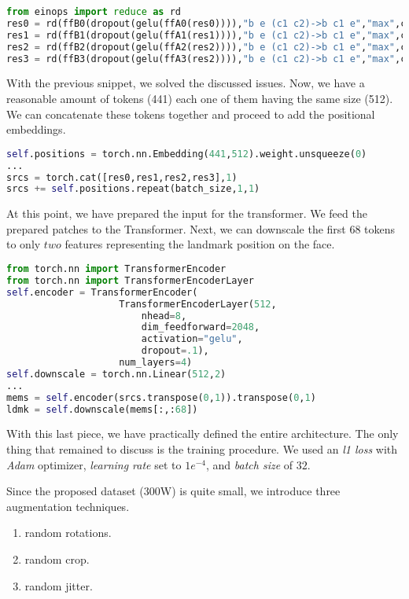 \begin{lstlisting}[language=Python]
from einops import reduce as rd
res0 = rd(ffB0(dropout(gelu(ffA0(res0)))),"b e (c1 c2)->b c1 e","max",c2=16)
res1 = rd(ffB1(dropout(gelu(ffA1(res1)))),"b e (c1 c2)->b c1 e","max",c2=8)
res2 = rd(ffB2(dropout(gelu(ffA2(res2)))),"b e (c1 c2)->b c1 e","max",c2=4)
res3 = rd(ffB3(dropout(gelu(ffA3(res2)))),"b e (c1 c2)->b c1 e","max",c2=1)
\end{lstlisting}

With the previous snippet, we solved the discussed issues. Now, we have a reasonable amount of tokens (441) each one of them having the same size (512). We can concatenate these tokens together and proceed to add the positional embeddings.

\begin{lstlisting}[language=Python]
self.positions = torch.nn.Embedding(441,512).weight.unsqueeze(0)
...
srcs = torch.cat([res0,res1,res2,res3],1) 
srcs += self.positions.repeat(batch_size,1,1)
\end{lstlisting}

At this point, we have prepared the input for the transformer. We feed the prepared patches to the Transformer. Next, we can downscale the first $68$ tokens to only $two$ features representing the landmark position on the face.

\begin{lstlisting}[language=Python]
from torch.nn import TransformerEncoder
from torch.nn import TransformerEncoderLayer
self.encoder = TransformerEncoder(
                    TransformerEncoderLayer(512,
                        nhead=8,
                        dim_feedforward=2048,
                        activation="gelu",
                        dropout=.1),
                    num_layers=4)
self.downscale = torch.nn.Linear(512,2)
...
mems = self.encoder(srcs.transpose(0,1)).transpose(0,1)
ldmk = self.downscale(mems[:,:68])
\end{lstlisting}

With this last piece, we have practically defined the entire architecture. The only thing that remained to discuss is the training procedure. We used an \textit{l1 loss} with \textit{Adam} optimizer, \textit{learning rate} set to $1e^{-4}$, and \textit{batch size} of $32$.

Since the proposed dataset (300W) is quite small, we introduce three augmentation techniques. 
\begin{enumerate}
    \item random rotations.
    \item random crop.
    \item random jitter.
\end{enumerate}

